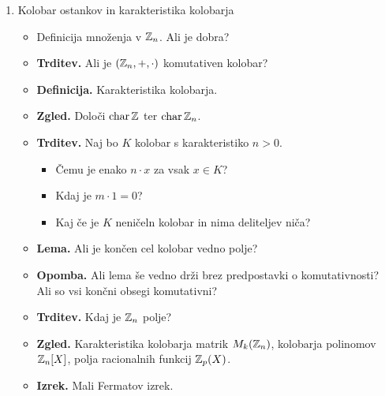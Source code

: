 \begin{enumerate}
    \item Kolobar ostankov in karakteristika kolobarja
    \begin{itemize}
        \item Definicija množenja v \(\mathbb{Z}_n\). Ali je dobra?
        \item \textbf{Trditev.} Ali je $(\mathbb{Z}_n, +, \cdot)$ komutativen kolobar?
        \item \textbf{Definicija.} Karakteristika kolobarja.
        \item \textbf{Zgled.} Določi \(\operatorname{char} \mathbb{Z}\) ter \(\operatorname{char} \mathbb{Z}_n\).
        \item \textbf{Trditev.} Naj bo \(K\) kolobar s karakteristiko \(n > 0\).
        \begin{itemize}
            \item Čemu je enako \(n \cdot x\) za vsak \(x \in K\)?
            \item Kdaj je \(m \cdot 1 = 0\)?
            \item Kaj če je \(K\) neničeln kolobar in nima deliteljev niča?
        \end{itemize}
        \item \textbf{Lema.} Ali je končen cel kolobar vedno polje?
        \item \textbf{Opomba.} Ali lema še vedno drži brez predpostavki o komutativnosti? Ali so vsi končni obsegi komutativni?
        \item \textbf{Trditev.} Kdaj je \(\mathbb{Z}_n\) polje?
        \item \textbf{Zgled.} Karakteristika kolobarja matrik \(M_k(\mathbb{Z}_n)\), kolobarja polinomov \(\mathbb{Z}_n[X]\), polja racionalnih funkcij \(\mathbb{Z}_p(X)\).
        \item \textbf{Izrek.} Mali Fermatov izrek. \todo{*}
    \end{itemize}


\end{enumerate}
